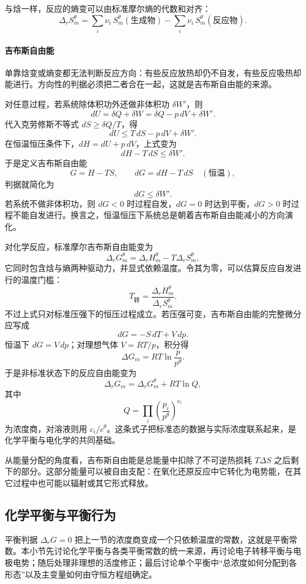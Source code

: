 \documentclass[UTF8]{ctexbook}
\begin{document}
与焓一样，反应的熵变可以由标准摩尔熵的代数和对齐：
\[
\Delta_rS_m^\theta=\sum_i\nu_i\,S_m^\theta(\text{生成物})
-\sum_i\nu_i\,S_m^\theta(\text{反应物}).
\]

\paragraph{吉布斯自由能}

单靠焓变或熵变都无法判断反应方向：有些反应放热却仍不自发，有些反应吸热却能进行。方向性的判据必须把二者合在一起，这就是吉布斯自由能的来源。

对任意过程，若系统除体积功外还做非体积功 \(\delta W'\)，则
\[
dU=\delta Q+\delta W=\delta Q-p\,dV+\delta W' .
\]
代入克劳修斯不等式 \(dS\geq\delta Q/T\)，得
\[
dU\leq T\,dS-p\,dV+\delta W' .
\]
在恒温恒压条件下，\(dH=dU+p\,dV\)，上式变为
\[
dH-T\,dS\leq\delta W' .
\]
于是定义吉布斯自由能
\[
G=H-TS,\qquad dG=dH-T\,dS\quad(\text{恒温}),
\]
判据就简化为
\[
dG\leq\delta W' .
\]
若系统不做非体积功，则 \(dG<0\) 时过程自发，\(dG=0\) 时达到平衡，\(dG>0\) 时过程不能自发进行。换言之，恒温恒压下系统总是朝着吉布斯自由能减小的方向演化。

对化学反应，标准摩尔吉布斯自由能变为
\[
\Delta_rG_m^\theta=\Delta_rH_m^\theta-T\Delta_rS_m^\theta ,
\]
它同时包含焓与熵两种驱动力，并显式依赖温度。令其为零，可以估算反应自发进行的温度门槛：
\[
T_{\mathrm{转}}=\frac{\Delta_rH_m^\theta}{\Delta_rS_m^\theta}.
\]
不过上式只对标准压强下的恒压过程成立。若压强可变，吉布斯自由能的完整微分应写成
\[
dG=-S\,dT+V\,dp .
\]
恒温下 \(dG=V\,dp\)；对理想气体 \(V=RT/p\)，积分得
\[
\Delta G_m=RT\ln\frac{p}{p^\theta}.
\]
于是非标准状态下的反应自由能变为
\[
\Delta_rG_m=\Delta_rG_m^\theta+RT\ln Q,
\]
其中
\[
Q=\prod_i\left(\frac{p_i}{p^\theta}\right)^{\nu_i}
\]
为浓度商，对溶液则用 \(c_i/c^\theta\)。这条式子把标准态的数据与实际浓度联系起来，是化学平衡与电化学的共同基础。

从能量分配的角度看，吉布斯自由能是总能量中扣除了不可逆热损耗 \(T\Delta S\) 之后剩下的部分。这部分能量可以被自由支配：在氧化还原反应中它转化为电势能，在其它过程中也可能以辐射或其它形式释放。

\subsection{化学平衡与平衡行为}

平衡判据 \(\Delta_rG=0\) 把上一节的浓度商变成一个只依赖温度的常数，这就是平衡常数。本小节先讨论化学平衡与各类平衡常数的统一来源，再讨论电子转移平衡与电极电势；随后处理非理想的活度修正；最后讨论单个平衡中“总浓度如何分配到各形态”以及主变量如何由守恒方程组确定。
\end{document}
